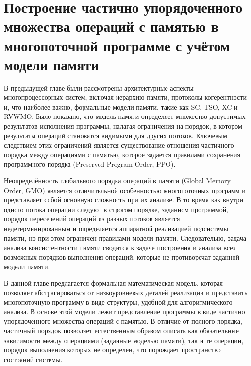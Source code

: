 \chapter{Построение частично упорядоченного множества операций с
памятью в многопоточной программе с учётом модели памяти}\label{sec:ch2}

В предыдущей главе были рассмотрены архитектурные аспекты
многопроцессорных систем, включая иерархию памяти, протоколы
когерентности и, что наиболее важно, формальные модели памяти, такие
как SC, TSO, XC и RVWMO. Было показано, что модель памяти определяет
множество допустимых результатов исполнения программы, налагая
ограничения на порядок, в котором результаты операций становятся
видимыми для других потоков. Ключевым следствием этих ограничений
является существование отношения частичного порядка между операциями
с памятью, которое задается правилами сохранения программного порядка
(Preserved Program Order, PPO).

Неопределённость глобального порядка операций в памяти (Global Memory
Order, GMO) является отличительной особенностью многопоточных
программ и представляет собой основную сложность при их анализе. В то
время как внутри одного потока операции следуют в строгом порядке,
заданном программой, порядок пересечений операций из разных потоков
является недетерминированным и определяется аппаратной реализацией
подсистемы памяти, но при этом ограничен правилами модели памяти.
Следовательно, задача анализа консистентности памяти сводится к
задаче построения и анализа всех возможных порядков выполнения
операций, которые не противоречат заданной модели памяти.

В данной главе предлагается формальная математическая модель, которая
позволяет абстрагироваться от низкоуровневых деталей реализации и
представить многопоточную программу в виде структуры, удобной для
алгоритмического анализа. В основе этой модели лежит представление
программы в виде частично упорядоченного множества операций с
памятью. В отличие от полного порядка, частичный порядок позволяет
естественным образом описать как обязательные зависимости между
операциями (заданные моделью памяти), так и те операции, порядок
выполнения которых не определен, что порождает пространство состояний системы.

